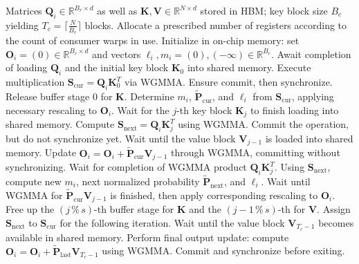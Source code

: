 \begin{enumerate}
\begin{algorithm}[H]
    \caption{\small\label{alg:flash3_wgmma}\textsc{FlashAttention-3} Consumer Warpgroup Forward Pass}
    \begin{algorithmic}[1]
      \REQUIRE  Matrices $\mathbf{Q}_i \in \mathbb{R}^{B_r \times d}$ as well as $\mathbf{K}, \mathbf{V} \in \mathbb{R}^{N \times d}$ stored in HBM; key block size $B_c$ yielding $T_c = \lceil \frac{N}{B_c} \rceil$ blocks.
      \STATE Allocate a prescribed number of registers according to the count of consumer warps in use.
      \STATE Initialize in on-chip memory: set $\mathbf{O}_i = (0) \in \mathbb{R}^{B_r \times d}$ and vectors $\ell_i, m_i = (0), (-\infty) \in \mathbb{R}^{B_r}$.
      \STATE Await completion of loading $\mathbf{Q}_i$ and the initial key block $\mathbf{K}_0$ into shared memory.
      \STATE Execute multiplication $\mathbf{S}_{\mathrm{cur}} = \mathbf{Q}_i \mathbf{K}_0^T$ via WGMMA. Ensure commit, then synchronize.
      \STATE Release buffer stage $0$ for $\mathbf{K}$.
      \STATE Determine $m_{i}$, $\tilde{\mathbf{P}}_{\mathrm{cur}}$, and $\ell_{i}$ from $\mathbf{S}_{\mathrm{cur}}$, applying necessary rescaling to $\mathbf{O}_i$.
        \STATE Wait for the $j$-th key block $\mathbf{K}_j$ to finish loading into shared memory.
        \label{code:mainloop_start}
        \STATE Compute $\mathbf{S}_{\mathrm{next}} = \mathbf{Q}_i \mathbf{K}_{j}^T$ using WGMMA. Commit the operation, but do not synchronize yet. \label{code:first_wgmma}
        \STATE Wait until the value block $\mathbf{V}_{j-1}$ is loaded into shared memory.
        \STATE Update $\mathbf{O}_{i} = \mathbf{O}_{i} + \tilde{\mathbf{P}}_{\mathrm{cur}} \mathbf{V}_{j-1}$ through WGMMA, committing without synchronizing. \label{code:second_wgmma}
        \STATE Wait for completion of WGMMA product $\mathbf{Q}_i \mathbf{K}_{j}^T$.
        \STATE Using $\mathbf{S}_{\mathrm{next}}$, compute new $m_{i}$, next normalized probability $\tilde{\mathbf{P}}_{\mathrm{next}}$, and $\ell_{i}$. \label{code:softmax}
        \STATE Wait until WGMMA for $\tilde{\mathbf{P}}_{\mathrm{cur}} \mathbf{V}_{j-1}$ is finished, then apply corresponding rescaling to $\mathbf{O}_i$.
        \STATE Free up the $(j\,\%\,s)$-th buffer stage for $\mathbf{K}$ and the $(j-1\,\%\,s)$-th for $\mathbf{V}$.
        \STATE Assign $\mathbf{S}_{\mathrm{next}}$ to $\mathbf{S}_{\mathrm{cur}}$ for the following iteration.
        \label{code:mainloop_end}
      \ENDFOR \STATE Wait until the value block $\mathbf{V}_{T_c - 1}$ becomes available in shared memory.
      \STATE Perform final output update: compute
      $\mathbf{O}_{i} = \mathbf{O}_{i} + \tilde{\mathbf{P}}_{\mathrm{last}} \mathbf{V}_{T_c - 1}$ using WGMMA. Commit and synchronize before exiting.


\end{algorithmic}
\end{algorithm}
\end{enumerate}
